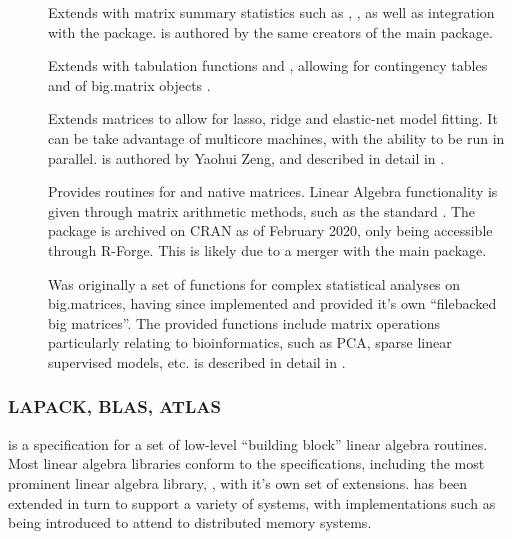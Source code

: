 \begin{description}
    \item[]
        Extends  with matrix summary statistics such as
        , , as well as integration with the 
        package\cite{emerson16}.  is authored by the same creators
        of the main  package.
    \item[]
        Extends  with tabulation functions and ,
        allowing for contingency tables and  of big.matrix
        objects \cite{kane16}.
    \item[]
        Extends  matrices to allow for lasso, ridge and elastic-net
        model fitting. It can be take advantage of multicore machines, with the
        ability to be run in parallel.  is authored by Yaohui Zeng, and
        described in detail in \textcite{zeng2017biglasso}.
    \item[]
        Provides  routines for  and native \R{} matrices. Linear
        Algebra functionality is given through matrix arithmetic methods, such
        as the standard . The package is archived
        on CRAN as of February 2020, only being accessible through R-Forge. This
        is likely due to a merger with the main  package.
    \item[]
        Was originally a set of functions for complex statistical analyses on
        big.matrices, having since implemented and provided it's own
        ``filebacked big matrices''\cite{prive2018efficient}. The provided
        functions include matrix operations particularly relating to
        bioinformatics, such as PCA, sparse linear supervised models, etc.
         is described in detail in \textcite{prive2018efficient}.
\end{description}

\subsubsection{LAPACK, BLAS, ATLAS}\label{subsec:blas-lapack}

 is a specification for a set of low-level ``building block'' linear
algebra routines\cite{lawson1979basic}. Most linear algebra libraries
conform to the  specifications, including the most prominent linear
algebra library, , with it's own set of
extensions\cite{demmel1989lapack}.  has been extended in turn to
support a variety of systems, with implementations such as 
being introduced to attend to distributed memory
systems\cite{choi1992scalapack}.

